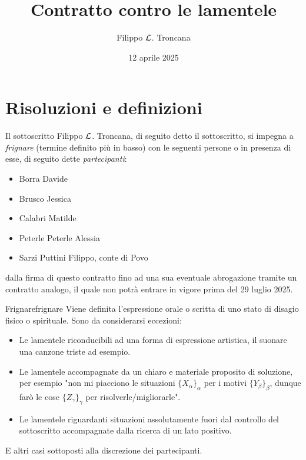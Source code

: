 \documentclass{article}
\title{Contratto contro le lamentele}
\author{Filippo $\mathcal{L}$. Troncana}
\date{12 aprile 2025}
\begin{document}
\maketitle

\section{Risoluzioni e definizioni}

Il sottoscritto Filippo $\mathcal{L}$. Troncana, di seguito detto il sottoscritto, si impegna a  \textit{frignare} (termine definito più in basso) con le seguenti persone o in presenza di esse, di seguito dette \textit{partecipanti}:\begin{itemize}
    \item Borra Davide
    \item Brusco Jessica
    \item Calabri Matilde
    \item Peterle Peterle Alessia
    \item Sarzi Puttini Filippo, conte di Povo
\end{itemize}
dalla firma di questo contratto fino ad una sua eventuale abrogazione tramite un contratto analogo, il quale non potrà entrare in vigore prima del 29 luglio 2025.

\begin{definition}{Frignare}{frignare}
    Viene definita  l'espressione orale o scritta di uno stato di disagio fisico o spirituale. Sono da considerarsi eccezioni:\begin{itemize}
        \item Le lamentele riconducibili ad una forma di espressione artistica, il suonare una canzone triste ad esempio.
        \item Le lamentele accompagnate da un chiaro e materiale proposito di soluzione, per esempio "non mi piacciono le situazioni $\{X_\alpha\}_\alpha$ per i motivi $\{Y_\beta\}_\beta$, dunque farò le cose $\{Z_\gamma\}_\gamma$ per risolverle/migliorarle".
        \item Le lamentele riguardanti situazioni assolutamente fuori dal controllo del sottoscritto accompagnate dalla ricerca di un lato positivo.
    \end{itemize}
    E altri casi sottoposti alla discrezione dei partecipanti.
\end{definition}
\end{document}
